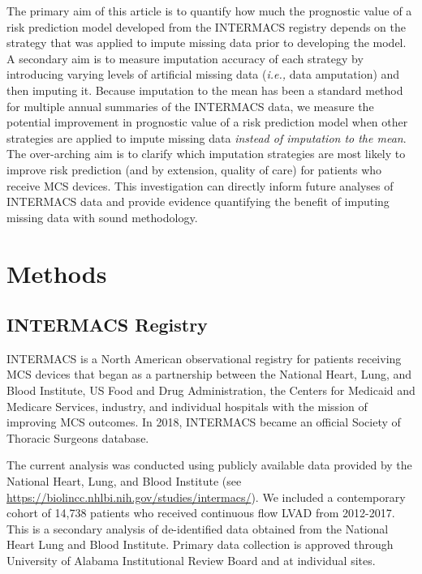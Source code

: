 \documentclass{article}
\begin{document}
The primary aim of this article is to quantify how much the prognostic
value of a risk prediction model developed from the INTERMACS registry
depends on the strategy that was applied to impute missing data prior to
developing the model. A secondary aim is to measure imputation accuracy
of each strategy by introducing varying levels of artificial missing
data (\textit{i.e., } data amputation) and then imputing it. Because
imputation to the mean has been a standard method for multiple annual
summaries of the INTERMACS data, we measure the potential improvement in
prognostic value of a risk prediction model when other strategies are
applied to impute missing data \emph{instead of imputation to the mean}.
The over-arching aim is to clarify which imputation strategies are most
likely to improve risk prediction (and by extension, quality of care)
for patients who receive MCS devices. This investigation can directly
inform future analyses of INTERMACS data and provide evidence
quantifying the benefit of imputing missing data with sound methodology.

\hypertarget{methods}{%
\section{Methods}\label{methods}}

\label{sec:methods}

\hypertarget{intermacs-registry}{%
\subsection{INTERMACS Registry}\label{intermacs-registry}}

\label{subsec:intermacs}

INTERMACS is a North American observational registry for patients
receiving MCS devices that began as a partnership between the National
Heart, Lung, and Blood Institute, US Food and Drug Administration, the
Centers for Medicaid and Medicare Services, industry, and individual
hospitals with the mission of improving MCS outcomes. In 2018, INTERMACS
became an official Society of Thoracic Surgeons database.

The current analysis was conducted using publicly available data
provided by the National Heart, Lung, and Blood Institute (see
\url{https://biolincc.nhlbi.nih.gov/studies/intermacs/}). We included a
contemporary cohort of 14,738 patients who received continuous flow LVAD
from 2012-2017. This is a secondary analysis of de-identified data
obtained from the National Heart Lung and Blood Institute. Primary data
collection is approved through University of Alabama Institutional
Review Board and at individual sites.
\end{document}
